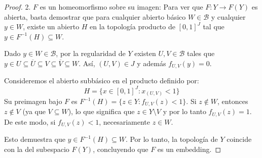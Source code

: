\documentclass{article}
\theoremstyle{plain}
\theoremstyle{definition}
\newcommand{\cl}[1]{\overline{#1}}              %
\begin{document}
\begin{proof}
    2. \( F \) es un homeomorfismo sobre su imagen:
    Para ver que \( F : Y \to F(Y) \) es abierta, basta demostrar que para cualquier abierto básico \( W \in \mathcal{B} \) y cualquier \( y \in W \), existe un abierto \( H \) en la topología producto de \( {[0, 1]}^J \) tal que \( y \in F^{-1}(H) \subseteq W \).

    Dado \( y \in W \in \mathcal{B} \), por la regularidad de \( Y \) existen \( U, V \in \mathcal{B} \) tales que \( y \in U \subseteq \cl{U} \subseteq V \subseteq \cl{V} \subseteq W \). Así, \( (U, V) \in J \) y además \( f_{U, V}(y) = 0 \).

    Consideremos el abierto subbásico en el producto definido por:
    \[
        H = \{ x \in {[0, 1]}^J : x_{(U, V)} < 1 \}
    \]
    Su preimagen bajo \( F \) es \( F^{-1}(H) = \{ z \in Y : f_{U, V}(z) < 1 \} \).
    Si \( z \notin W \), entonces \( z \notin V \) (ya que \( V \subseteq W \)), lo que significa que \( z \in Y \setminus V \) y por lo tanto \( f_{U, V}(z) = 1 \). De este modo, si \( f_{U, V}(z) < 1 \), necesariamente \( z \in W \).

    Esto demuestra que \( y \in F^{-1}(H) \subseteq W \). Por lo tanto, la topología de \( Y \) coincide con la del subespacio \( F(Y) \), concluyendo que \( F \) es un embedding.
\end{proof}
\end{document}
